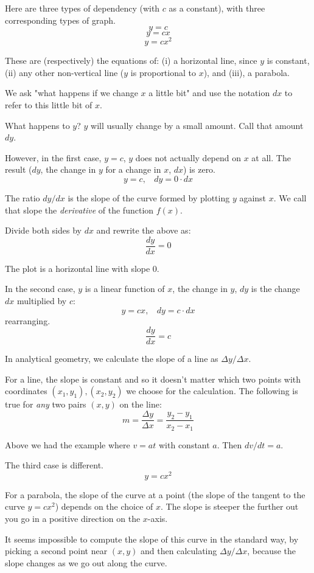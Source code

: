 \documentclass[11pt, oneside]{article}
\begin{document}
Here are three types of dependency (with $c$ as a constant), with three corresponding types of graph.
\[ y = c \]
\[ y = cx \]
\[ y = cx^2 \]

These are (respectively) the equations of:  (i) a horizontal line, since $y$ is constant, (ii) any other non-vertical line ($y$ is proportional to $x$), and (iii), a parabola.
 
We ask "what happens if we change $x$ a little bit" and use the notation $dx$ to refer to this little bit of $x$.  

What happens to $y$?  $y$ will usually change by a small amount.  Call that amount $dy$.

However, in the first case, $y = c$, $y$ does not actually depend on $x$ at all.  The result ($dy$, the change in $y$ for a change in $x$, $dx$) is zero.
\[ y = c, \ \ \ \ dy = 0 \cdot dx \]

The ratio $dy/dx$ is the slope of the curve formed by plotting $y$ against $x$.  We call that slope the \emph{derivative} of the function $f(x)$.

Divide both sides by $dx$ and rewrite the above as:
\[ \frac{dy}{dx} = 0 \]

The plot is a horizontal line with slope $0$.

In the second case, $y$ is a linear function of $x$, the change in $y$, $dy$ is the change $dx$ multiplied by $c$:
\[ y = cx, \ \ \ \  dy = c \cdot dx \]
rearranging.
\[ \frac{dy}{dx} = c \]

In analytical geometry, we calculate the slope of a line as $\Delta y/\Delta x$.

For a line, the slope is constant and so it doesn't matter which two points with coordinates $(x_1,y_1), (x_2,y_2)$ we choose for the calculation.  The following is true for \emph{any} two pairs $(x,y)$ on the line:
\[ m = \frac{\Delta y}{\Delta x} = \frac{y_2 - y_1}{x_2 - x_1} \]

Above we had the example where $v = at$ with constant $a$.  Then $dv/dt = a$.

The third case is different.
\[ y = cx^2 \]

For a parabola, the slope of the curve at a point (the slope of the tangent to the curve $y = cx^2$) depends on the choice of $x$.  The slope is steeper the further out you go in a positive direction on the $x$-axis.

It seems impossible to compute the slope of this curve in the standard way, by picking a second point near $(x,y)$ and then calculating $\Delta y/\Delta x$, because the slope changes as we go out along the curve.
\end{document}
